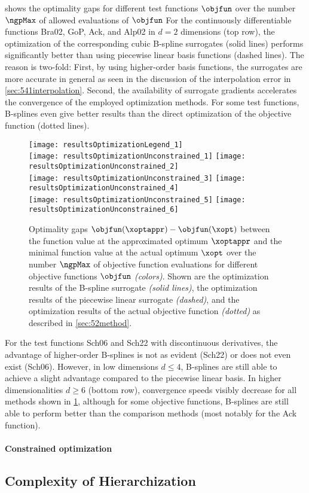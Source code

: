 shows the optimality gaps for different test functions $\objfun$
over the number $\ngpMax$ of allowed evaluations of $\objfun$
For the continuously differentiable functions Bra02, GoP, Ack, and Alp02
in $d = 2$ dimensions (top row),
the optimization of the corresponding cubic B-spline surrogates (solid lines)
performs significantly better than using piecewise linear basis functions
(dashed lines).
The reason is two-fold:
First, by using higher-order basis functions, the surrogates are more accurate
in general as seen in the discussion of the interpolation error in
\cref{sec:541interpolation}.
Second, the availability of surrogate gradients accelerates the
convergence of the employed optimization methods.
For some test functions, B-splines even give better results than
the direct optimization of the objective function (dotted lines).

\begin{figure}
  \texttt{[image: resultsOptimizationLegend\_1]}\\[2mm]%
  \texttt{[image: resultsOptimizationUnconstrained\_1]}%
  \hfill%
  \texttt{[image: resultsOptimizationUnconstrained\_2]}%
  \\[2mm]%
  \texttt{[image: resultsOptimizationUnconstrained\_3]}%
  \hfill%
  \texttt{[image: resultsOptimizationUnconstrained\_4]}%
  \\[2mm]%
  \texttt{[image: resultsOptimizationUnconstrained\_5]}%
  \hfill%
  \texttt{[image: resultsOptimizationUnconstrained\_6]}%
  \caption[Optimality gaps for different objective functions]{%
    Optimality gaps $\objfun(\xoptappr) - \objfun(\xopt)$ between
    the function value at the approximated optimum $\xoptappr$ and
    the minimal function value at the actual optimum $\xopt$
    over the number $\ngpMax$ of objective function evaluations
    for different objective functions $\objfun$ \emph{(colors)}.
    Shown are the optimization results of the B-spline surrogate
    \emph{(solid lines)},
    the optimization results of the piecewise linear surrogate
    \emph{(dashed)}, and
    the optimization results of the actual objective function
    \emph{(dotted)} as described in \cref{sec:52method}.%
  }%
  \label{fig:resultsOptimizationUnconstrainedTestFunctions}%
\end{figure}

For the test functions Sch06 and Sch22 with discontinuous derivatives,
the advantage of higher-order B-splines is not as evident (Sch22) or
does not even exist (Sch06).
However, in low dimensions $d \le 4$, B-splines are still able
to achieve a slight advantage compared to the piecewise linear basis.
In higher dimensionalities $d \ge 6$ (bottom row),
convergence speeds visibly decrease for all methods shown in
\cref{fig:resultsOptimizationUnconstrainedTestFunctions},
although for some objective functions, B-splines are still able
to perform better than the comparison methods
(most notably for the Ack function).

\paragraph{Constrained optimization}

\blindtext{}



\subsection{Complexity of Hierarchization}
\label{sec:543complexity}

\blindtext{}
